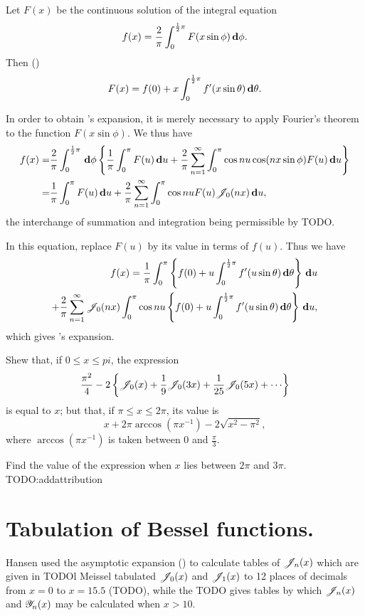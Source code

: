 \documentclass{book}
\begin{document}
Let $F(x)$ be the continuous solution of the integral equation
$$
f(x) = \frac{2}{\pi} \int_{0}^{\frac{1}{2} \pi} F(x \sin\phi) \, \mathbf{d} \phi.
$$
Then ()
$$
F(x) = f(0) + x \int_{0}^{\frac{1}{2}\pi} f'(x\sin\theta) \, \mathbf{d}\theta.
$$

In order to obtain \Schlomilch's expansion, it is merely necessary to
apply Fourier's theorem to the function $F(x\sin\phi)$. We thus have
\begin{align*}
  f(x)
  =&
  \frac{2}{\pi}
  \int_{0}^{\frac{1}{2}\pi}
  \, \mathbf{d}\phi
  \left\{ 
    \frac{1}{\pi}
    \int_{0}^{\pi} F(u) \, \mathbf{d} u
    +
    \frac{2}{\pi}
    \sum_{n=1}^{\infty}
    \int_{0}^{\pi} \cos nu \cos(nx\sin\phi) F(u) \, \mathbf{d} u
   \right\}
  \\
  =&
  \frac{1}{\pi}
  \int_{0}^{\pi}
  F(u) \, \mathbf{d} u
  +
  \frac{2}{\pi}
  \sum_{n=1}^{\infty}
  \int_{0}^{\pi} \cos nu F(u) \mathscr{J}_0(nx) \, \mathbf{d} u,
\end{align*}
the interchange of summation and integration being permissible by
TODO.

In this equation, replace $F(u)$ by its value in terms of $f(u)$. Thus
we have
\begin{align*}
  f(x)
  =
  \frac{1}{\pi}
  \int_{0}^{\pi}
  \left\{ 
    f(0) + u \int_{0}^{\frac{1}{2}\pi} f'(u\sin\theta) \, \mathbf{d}\theta
   \right\}
  \, \mathbf{d} u
  \\
  +
  \frac{2}{\pi}
  \sum_{n=1}^{\infty}
  \mathscr{J}_{0}(nx)
  \int_{0}^{\pi}
  \cos nu
  \left\{ 
    f(0) + u \int_{0}^{\frac{1}{2}\pi} f'(u\sin\theta) \, \mathbf{d}\theta
   \right\}
  \, \mathbf{d} u,
\end{align*}
which gives \Schlomilch's expansion.
\begin{wandwexample}
  Shew that, if $0 \leq x \leq pi$, the expression
  $$
  \frac{\pi^{2}}{4}
  -
  2
  \thebrace{
    \besJ_{0}(x)
    + \frac{1}{9} \besJ_{0}(3x)
    + \frac{1}{25} \besJ_{0}(5x)
    + \cdots
  }
  $$
  is equal to $x$; but that, if $\pi \leq x \leq 2\pi$, its value is
  $$
  x
  +
  2\pi \arccos (\pi x^{-1})
  -
  2 \sqrt{x^2 - \pi^2},
  $$
  where $\arccos(\pi x^{-1})$ is taken between $0$ and
  $\frac{\pi}{3}$.

  Find the value of the expression when $x$ lies between $2\pi$ and
  $3\pi$.
  TODO:addattribution
\end{wandwexample}

\section{Tabulation of Bessel functions.}
Hansen used the asymptotic expansion () to
calculate tables of $\mathscr{J}_n(x)$ which are given in TODOl
Meissel tabulated $\mathscr{J}_0(x)$ and $\mathscr{J}_1(x)$ to 12 places of
decimals from $x=0$ to $x = 15.5$ (TODO), while the TODO gives tables
by which $\mathscr{J}_n(x)$ and $\mathscr{Y}_n(x)$ may be calculated when $x >
10$.
\end{document}
